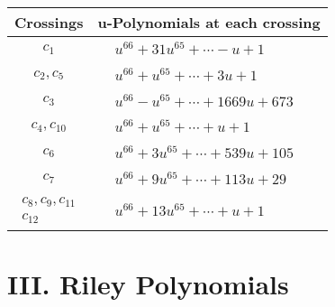 \documentclass[1p]{elsarticle_modified}
\theoremstyle{definition}
\begin{document}
\begin{tabular}{m{50pt}|m{274pt}}
Crossings & \hspace{64pt}u-Polynomials at each crossing \\
\hline $$\begin{aligned}c_{1}\end{aligned}$$&$\begin{aligned}
&u^{66}+31 u^{65}+\cdots- u+1
\end{aligned}$\\
\hline $$\begin{aligned}c_{2},c_{5}\end{aligned}$$&$\begin{aligned}
&u^{66}+u^{65}+\cdots+3 u+1
\end{aligned}$\\
\hline $$\begin{aligned}c_{3}\end{aligned}$$&$\begin{aligned}
&u^{66}- u^{65}+\cdots+1669 u+673
\end{aligned}$\\
\hline $$\begin{aligned}c_{4},c_{10}\end{aligned}$$&$\begin{aligned}
&u^{66}+u^{65}+\cdots+u+1
\end{aligned}$\\
\hline $$\begin{aligned}c_{6}\end{aligned}$$&$\begin{aligned}
&u^{66}+3 u^{65}+\cdots+539 u+105
\end{aligned}$\\
\hline $$\begin{aligned}c_{7}\end{aligned}$$&$\begin{aligned}
&u^{66}+9 u^{65}+\cdots+113 u+29
\end{aligned}$\\
\hline $$\begin{aligned}c_{8},c_{9},c_{11}\\c_{12}\end{aligned}$$&$\begin{aligned}
&u^{66}+13 u^{65}+\cdots+u+1
\end{aligned}$\\
\hline
\end{tabular}\newpage\renewcommand{\arraystretch}{1}
\centering \section*{ III. Riley Polynomials}
\end{document}
